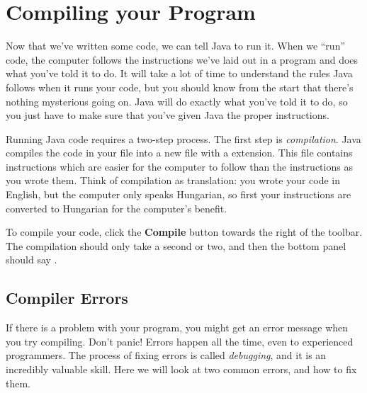 \section{Compiling your Program}

Now that we've written some code, we can tell Java to run it. When we ``run'' code, the computer follows the instructions we've laid out in a program and does what you've told it to do. It will take a lot of time to understand the rules Java follows when it runs your code, but you should know from the start that there's nothing mysterious going on. Java will do exactly what you've told it to do, so you just have to make sure that you've given Java the proper instructions.

Running Java code requires a two-step process. The first step is \emph{compilation}. Java compiles the code in your  file into a new file with a  extension. This file contains instructions which are easier for the computer to follow than the instructions as you wrote them. Think of compilation as translation: you wrote your code in English, but the computer only speaks Hungarian, so first your instructions are converted to Hungarian for the computer's benefit.

To compile your code, click the \textbf{Compile} button towards the right of the toolbar. The compilation should only take a second or two, and then the bottom panel should say .

\subsection{Compiler Errors}

If there is a problem with your program, you might get an error message when you try compiling. Don't panic! Errors happen all the time, even to experienced programmers. The process of fixing errors is called \emph{debugging}, and it is an incredibly valuable skill. Here we will look at two common errors, and how to fix them. 

